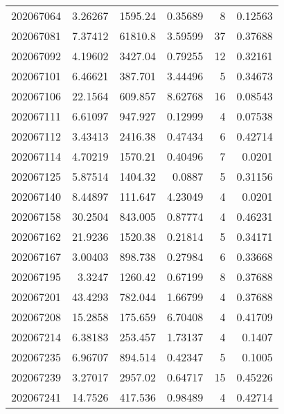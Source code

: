 \begin{tabular}{rrrrrr}
 202067064 &          3.26267 &     1595.24   &            0.35689 &           8 & 0.12563 \\
 202067081 &          7.37412 &    61810.8    &            3.59599 &          37 & 0.37688 \\
 202067092 &          4.19602 &     3427.04   &            0.79255 &          12 & 0.32161 \\
 202067101 &          6.46621 &      387.701  &            3.44496 &           5 & 0.34673 \\
 202067106 &         22.1564  &      609.857  &            8.62768 &          16 & 0.08543 \\
 202067111 &          6.61097 &      947.927  &            0.12999 &           4 & 0.07538 \\
 202067112 &          3.43413 &     2416.38   &            0.47434 &           6 & 0.42714 \\
 202067114 &          4.70219 &     1570.21   &            0.40496 &           7 & 0.0201  \\
 202067125 &          5.87514 &     1404.32   &            0.0887  &           5 & 0.31156 \\
 202067140 &          8.44897 &      111.647  &            4.23049 &           4 & 0.0201  \\
 202067158 &         30.2504  &      843.005  &            0.87774 &           4 & 0.46231 \\
 202067162 &         21.9236  &     1520.38   &            0.21814 &           5 & 0.34171 \\
 202067167 &          3.00403 &      898.738  &            0.27984 &           6 & 0.33668 \\
 202067195 &          3.3247  &     1260.42   &            0.67199 &           8 & 0.37688 \\
 202067201 &         43.4293  &      782.044  &            1.66799 &           4 & 0.37688 \\
 202067208 &         15.2858  &      175.659  &            6.70408 &           4 & 0.41709 \\
 202067214 &          6.38183 &      253.457  &            1.73137 &           4 & 0.1407  \\
 202067235 &          6.96707 &      894.514  &            0.42347 &           5 & 0.1005  \\
 202067239 &          3.27017 &     2957.02   &            0.64717 &          15 & 0.45226 \\
 202067241 &         14.7526  &      417.536  &            0.98489 &           4 & 0.42714 \\

\end{tabular}
